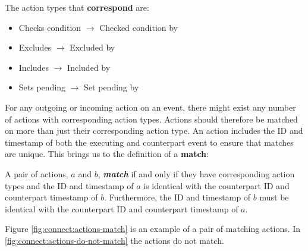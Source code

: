 	\begin{definition}
		\label{def:happensbeforeaction}
		The action types that \textbf{correspond} are:
			\begin{itemize}
				\item Checks condition $\rightarrow$ Checked condition by
                \item Excludes $\rightarrow$ Excluded by
				\item Includes $\rightarrow$ Included by
				\item Sets pending $\rightarrow$ Set pending by
			\end{itemize}
	\end{definition}
	
	\noindent For any outgoing or incoming action on an event, there might exist any number of actions with corresponding action types. Actions should therefore be matched on more than just their corresponding action type. An action includes the ID and timestamp of both the executing and counterpart event to ensure that matches are unique.
	This brings us to the definition of a \textbf{match}:
    
    \begin{definition}
    	\label{def:action:matching}
    	A pair of actions, $a$ and $b$, \textit{\textbf{match}} if and only if they have corresponding action types and the ID and timestamp of $a$ is identical with the counterpart ID and counterpart timestamp of $b$. Furthermore, the ID and timestamp of $b$ must be identical with the counterpart ID and counterpart timestamp of $a$.
    \end{definition}
    
    \noindent Figure \ref{fig:connect:actions-match} is an example of a pair of matching actions.  In \autoref{fig:connect:actions-do-not-match} the actions do not match.
    
